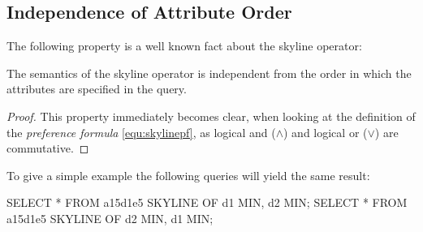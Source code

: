 

\subsection{Independence of Attribute Order}
\label{sec:attributeorder}

The following property is a well known fact about the skyline operator:

\begin{property}\label{the:attributeorder}
The semantics of the skyline operator is independent from the order
in which the attributes are specified in the query.
\end{property}
\begin{proof}
This property immediately becomes clear, when looking at the definition
of the \emph{preference formula} \eqref{equ:skylinepf}, as
logical and ($\land$) and logical or ($\lor$) are commutative.
\end{proof}

\noindent
To give a simple example the following queries will yield the same
result:

\begin{interactive}
SELECT * FROM a15d1e5 SKYLINE OF d1 MIN, d2 MIN;
SELECT * FROM a15d1e5 SKYLINE OF d2 MIN, d1 MIN;
\end{interactive}

